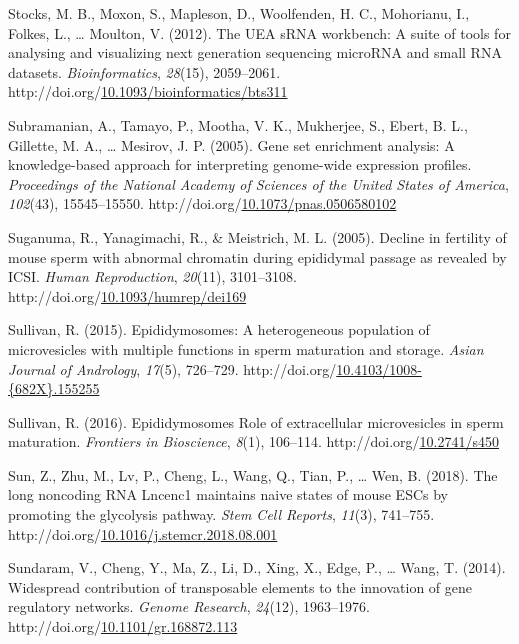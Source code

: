 \documentclass[12pt,twoside]{reedthesis}
\newlength{\cslhangindent}
\newenvironment{CSLReferences}[2] %
 {%
  \setlength{\parindent}{0pt}
  \ifodd #1 \everypar{\setlength{\hangindent}{\cslhangindent}}\ignorespaces\fi
  \ifnum #2 > 0
  \setlength{\parskip}{#2\baselineskip}
  \fi
 }%
 {}
\begin{document}
\begin{CSLReferences}{1}{0}
\leavevmode{}%
Stocks, M. B., Moxon, S., Mapleson, D., Woolfenden, H. C., Mohorianu, I., Folkes, L., \ldots{} Moulton, V. (2012). The UEA sRNA workbench: A suite of tools for analysing and visualizing next generation sequencing microRNA and small RNA datasets. \emph{Bioinformatics}, \emph{28}(15), 2059--2061. http://doi.org/\href{https://doi.org/10.1093/bioinformatics/bts311}{10.1093/bioinformatics/bts311}

\leavevmode{}%
Subramanian, A., Tamayo, P., Mootha, V. K., Mukherjee, S., Ebert, B. L., Gillette, M. A., \ldots{} Mesirov, J. P. (2005). Gene set enrichment analysis: A knowledge-based approach for interpreting genome-wide expression profiles. \emph{Proceedings of the National Academy of Sciences of the United States of America}, \emph{102}(43), 15545--15550. http://doi.org/\href{https://doi.org/10.1073/pnas.0506580102}{10.1073/pnas.0506580102}

\leavevmode{}%
Suganuma, R., Yanagimachi, R., \& Meistrich, M. L. (2005). Decline in fertility of mouse sperm with abnormal chromatin during epididymal passage as revealed by {ICSI}. \emph{Human Reproduction}, \emph{20}(11), 3101--3108. http://doi.org/\href{https://doi.org/10.1093/humrep/dei169}{10.1093/humrep/dei169}

\leavevmode{}%
Sullivan, R. (2015). Epididymosomes: A heterogeneous population of microvesicles with multiple functions in sperm maturation and storage. \emph{Asian Journal of Andrology}, \emph{17}(5), 726--729. http://doi.org/\href{https://doi.org/10.4103/1008-\%7B682X\%7D.155255}{10.4103/1008-\{682X\}.155255}

\leavevmode{}%
Sullivan, R. (2016). Epididymosomes Role of extracellular microvesicles in sperm maturation. \emph{Frontiers in Bioscience}, \emph{8}(1), 106--114. http://doi.org/\href{https://doi.org/10.2741/s450}{10.2741/s450}

\leavevmode{}%
Sun, Z., Zhu, M., Lv, P., Cheng, L., Wang, Q., Tian, P., \ldots{} Wen, B. (2018). The long noncoding RNA Lncenc1 maintains naive states of mouse ESCs by promoting the glycolysis pathway. \emph{Stem Cell Reports}, \emph{11}(3), 741--755. http://doi.org/\href{https://doi.org/10.1016/j.stemcr.2018.08.001}{10.1016/j.stemcr.2018.08.001}

\leavevmode{}%
Sundaram, V., Cheng, Y., Ma, Z., Li, D., Xing, X., Edge, P., \ldots{} Wang, T. (2014). Widespread contribution of transposable elements to the innovation of gene regulatory networks. \emph{Genome Research}, \emph{24}(12), 1963--1976. http://doi.org/\href{https://doi.org/10.1101/gr.168872.113}{10.1101/gr.168872.113}


\end{CSLReferences}
\end{document}
